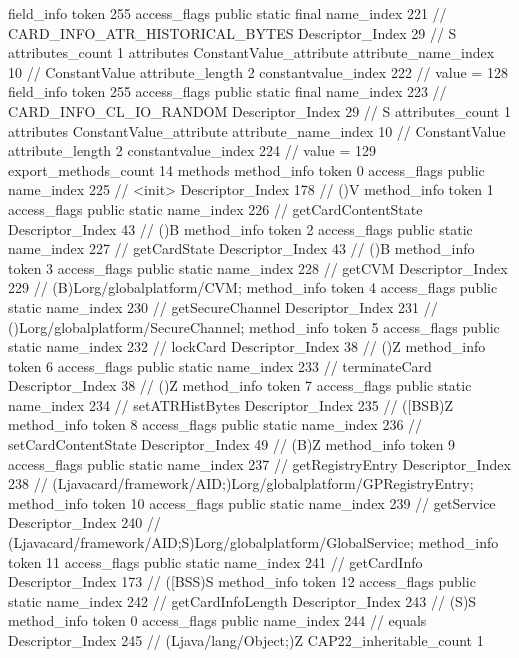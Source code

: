 {{{{{{{				}
				}
			}
			field_info {
				token	255
				access_flags	public static final
				name_index	221		// CARD_INFO_ATR_HISTORICAL_BYTES
				Descriptor_Index	29		// S
				attributes_count	1
				attributes {
				ConstantValue_attribute {
					attribute_name_index	10		// ConstantValue
					attribute_length	2
					constantvalue_index	222		// value = 128
				}
				}
			}
			field_info {
				token	255
				access_flags	public static final
				name_index	223		// CARD_INFO_CL_IO_RANDOM
				Descriptor_Index	29		// S
				attributes_count	1
				attributes {
				ConstantValue_attribute {
					attribute_name_index	10		// ConstantValue
					attribute_length	2
					constantvalue_index	224		// value = 129
				}
				}
			}
			}
			export_methods_count	14
			methods {
				method_info {
					token	0
					access_flags	public
					name_index	225		// <init>
					Descriptor_Index	178		// ()V
				}
				method_info {
					token	1
					access_flags	public static
					name_index	226		// getCardContentState
					Descriptor_Index	43		// ()B
				}
				method_info {
					token	2
					access_flags	public static
					name_index	227		// getCardState
					Descriptor_Index	43		// ()B
				}
				method_info {
					token	3
					access_flags	public static
					name_index	228		// getCVM
					Descriptor_Index	229		// (B)Lorg/globalplatform/CVM;
				}
				method_info {
					token	4
					access_flags	public static
					name_index	230		// getSecureChannel
					Descriptor_Index	231		// ()Lorg/globalplatform/SecureChannel;
				}
				method_info {
					token	5
					access_flags	public static
					name_index	232		// lockCard
					Descriptor_Index	38		// ()Z
				}
				method_info {
					token	6
					access_flags	public static
					name_index	233		// terminateCard
					Descriptor_Index	38		// ()Z
				}
				method_info {
					token	7
					access_flags	public static
					name_index	234		// setATRHistBytes
					Descriptor_Index	235		// ([BSB)Z
				}
				method_info {
					token	8
					access_flags	public static
					name_index	236		// setCardContentState
					Descriptor_Index	49		// (B)Z
				}
				method_info {
					token	9
					access_flags	public static
					name_index	237		// getRegistryEntry
					Descriptor_Index	238		// (Ljavacard/framework/AID;)Lorg/globalplatform/GPRegistryEntry;
				}
				method_info {
					token	10
					access_flags	public static
					name_index	239		// getService
					Descriptor_Index	240		// (Ljavacard/framework/AID;S)Lorg/globalplatform/GlobalService;
				}
				method_info {
					token	11
					access_flags	public static
					name_index	241		// getCardInfo
					Descriptor_Index	173		// ([BSS)S
				}
				method_info {
					token	12
					access_flags	public static
					name_index	242		// getCardInfoLength
					Descriptor_Index	243		// (S)S
				}
				method_info {
					token	0
					access_flags	public
					name_index	244		// equals
					Descriptor_Index	245		// (Ljava/lang/Object;)Z
				}
			}
			CAP22_inheritable_count	1
		}
	}
}
